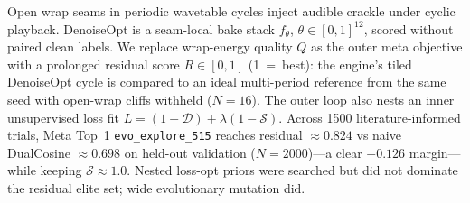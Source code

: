Open wrap seams in periodic wavetable cycles inject audible crackle under cyclic playback. DenoiseOpt is a seam-local bake stack $f_\theta$, $\theta\in[0,1]^{12}$, scored without paired clean labels. We replace wrap-energy quality $Q$ as the outer meta objective with a prolonged residual score $R\in[0,1]$ (1~=~best): the engine's tiled DenoiseOpt cycle is compared to an ideal multi-period reference from the same seed with open-wrap cliffs withheld ($N{=}16$). The outer loop also nests an inner unsupervised loss fit $L=(1-\mathcal{D})+\lambda(1-\mathcal{S})$. Across 1500 literature-informed trials, Meta Top~1 \texttt{evo\_explore\_515} reaches residual $\approx 0.824$ vs naive DualCosine $\approx 0.698$ on held-out validation ($N{=}2000$)---a clear $+0.126$ margin---while keeping $\mathcal{S}\approx 1.0$. Nested loss-opt priors were searched but did not dominate the residual elite set; wide evolutionary mutation did.
